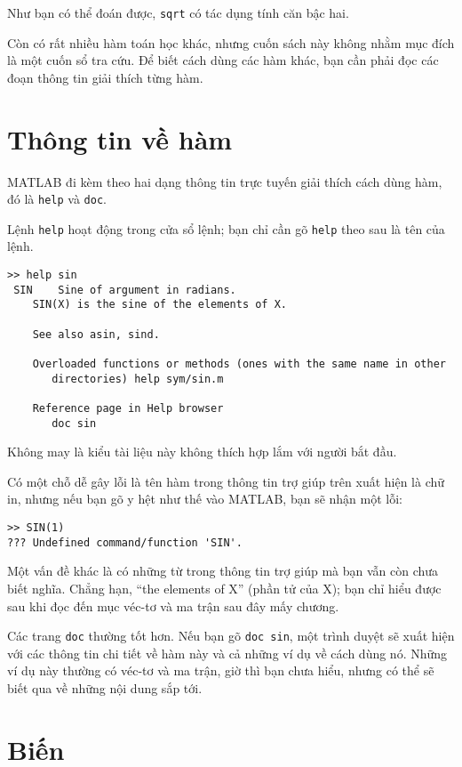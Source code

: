 \documentclass[12pt]{book}
\begin{document}
Như bạn có thể đoán được, {\tt sqrt} có tác dụng tính căn bậc hai.

Còn có rất nhiều hàm toán học khác, nhưng cuốn sách này không 
nhằm mục đích là một cuốn sổ tra cứu. Để biết cách dùng các hàm
khác, bạn cần phải đọc các đoạn thông tin giải thích từng hàm.


\section{Thông tin về hàm}

MATLAB đi kèm theo hai dạng thông tin trực tuyến giải thích cách dùng hàm, 
đó là {\tt help} và {\tt doc}.

Lệnh \texttt{help} hoạt động trong cửa sổ lệnh; bạn chỉ cần gõ {\tt help}
theo sau là tên của lệnh.

\begin{verbatim}
>> help sin
 SIN    Sine of argument in radians.
    SIN(X) is the sine of the elements of X.
 
    See also asin, sind.

    Overloaded functions or methods (ones with the same name in other
       directories) help sym/sin.m

    Reference page in Help browser
       doc sin
\end{verbatim}
%
Không may là kiểu tài liệu này không thích hợp lắm với người bắt đầu.

Có một chỗ dễ gây lỗi là tên hàm trong thông tin trợ giúp trên
xuất hiện là chữ in, nhưng nếu bạn gõ y hệt như thế vào
MATLAB, bạn sẽ nhận một lỗi:

\begin{verbatim}
>> SIN(1)
??? Undefined command/function 'SIN'.
\end{verbatim}
%
Một vấn đề khác là có những từ trong thông tin trợ giúp mà bạn vẫn
còn chưa biết nghĩa. Chẳng hạn, ``the elements of X'' (phần tử của X);
bạn chỉ hiểu được sau khi đọc đến mục véc-tơ và ma trận sau đây
mấy chương.

Các trang \texttt{doc} thường tốt hơn. Nếu bạn gõ {\tt doc sin}, một
trình duyệt sẽ xuất hiện với các thông tin chi tiết về hàm này và cả
những ví dụ về cách dùng nó. Những ví dụ này thường có véc-tơ và
ma trận, giờ thì bạn chưa hiểu, nhưng có thể sẽ biết qua về những
nội dung sắp tới.


\section{Biến}
\end{document}
